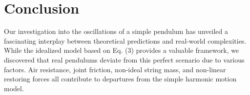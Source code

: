 \chapter{Conclusion}

Our investigation into the oscillations of a simple pendulum has unveiled a fascinating interplay between theoretical predictions and real-world complexities. While the idealized model based on Eq. (3) provides a valuable framework, we discovered that real pendulums deviate from this perfect scenario due to various factors. Air resistance, joint friction, non-ideal string mass, and non-linear restoring forces all contribute to departures from the simple harmonic motion model.



